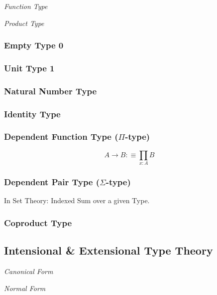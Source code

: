 \documentclass{article}
\begin{document}
\emph{Function Type}

\emph{Product Type}

\subsubsection{Empty Type $\mathbf{0}$}

\subsubsection{Unit Type $\mathbf{1}$}

\subsubsection{Natural Number Type}

\subsubsection{Identity Type}

\subsubsection{Dependent Function Type ($\Pi$-type)}

\[
    A \rightarrow B :\equiv \prod_{x:A} B
\]

\subsubsection{Dependent Pair Type ($\Sigma$-type)}

In Set Theory: Indexed Sum over a given Type.

\subsubsection{Coproduct Type}



\subsection{Intensional \& Extensional Type Theory}
\label{subsec:intension_extension}

\emph{Canonical Form}

\emph{Normal Form}
\end{document}

